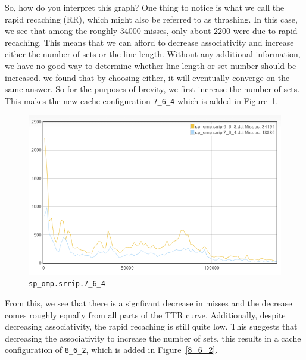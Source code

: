 So, how do you interpret this graph? One thing to notice is what we call the rapid recaching (RR), which might also be referred to as thrashing. In this case, we see that among the roughly 34000 misses, only about 2200 were due to rapid recaching. This means that we can afford to decrease associativity and increase either the number of sets or the line length. Without any additional information, we have no good way to determine whether line length or set number should be increased. we found that by choosing either, it will eventually converge on the same answer. So for the purposes of brevity, we first increase the number of sets. This makes the new cache configuration \texttt{7\_6\_4} which is added in Figure~\ref{7_6_4}.

\begin{figure}[ht]
\begin{center}
\includegraphics[width={0.9\columnwidth}]{images/sp_omp-srrip-7_6_4}
\end{center}
\caption{\texttt{sp\_omp.srrip.7\_6\_4}}
\label{7_6_4}
\end{figure}

From this, we see that there is a signficant decrease in misses and the decrease comes roughly equally from all parts of the TTR curve. Additionally, despite decreasing associativity, the rapid recaching is still quite low. This suggests that decreasing the associativity to increase the number of sets, this results in a cache configuration of \texttt{8\_6\_2}, which is added in Figure~\ref{8_6_2}.

